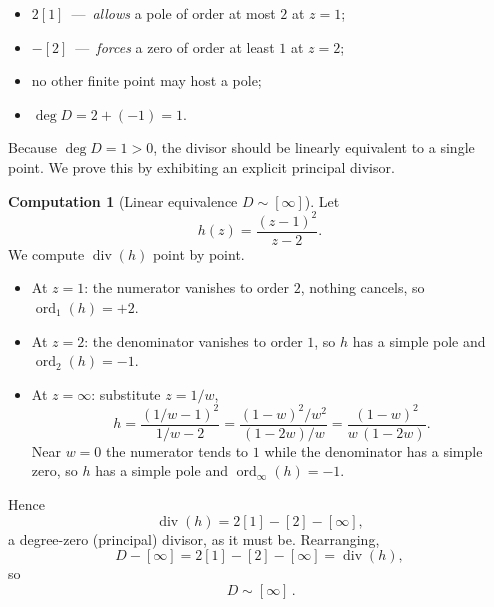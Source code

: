 \documentclass[11pt]{article}
\newcommand{\divisor}{\operatorname{div}}
\newcommand{\ord}{\operatorname{ord}}
\theoremstyle{definition}
\newtheorem{computation}{Computation}
\theoremstyle{plain}
\begin{document}
\begin{itemize}
  \item \(2[1]\) \,---\, \emph{allows} a pole of order at most \(2\) at \(z=1\);
  \item \(-[2]\) \,---\, \emph{forces} a zero of order at least \(1\) at \(z=2\);
  \item no other finite point may host a pole;
  \item \(\deg D = 2+(-1)=1.\)
\end{itemize}

\begin{center}
\end{center}

\noindent
Because \(\deg D=1>0\), the divisor should be linearly equivalent to a single
point. We prove this by exhibiting an explicit principal divisor.

\begin{computation}[{Linear equivalence \(D\sim[\infty]\)}]
Let
\[
  h(z)=\frac{(z-1)^2}{z-2}.
\]
We compute \(\divisor(h)\) point by point.
\begin{itemize}
  \item At \(z=1\): the numerator vanishes to order \(2\), nothing cancels, so
        \(\ord_1(h)=+2\).
  \item At \(z=2\): the denominator vanishes to order \(1\), so \(h\) has a
        simple pole and \(\ord_2(h)=-1\).
  \item At \(z=\infty\): substitute \(z=1/w\),
        \[
          h=\frac{(1/w-1)^2}{1/w-2}
           =\frac{(1-w)^2/w^2}{(1-2w)/w}
           =\frac{(1-w)^2}{w\,(1-2w)} .
        \]
        Near \(w=0\) the numerator tends to \(1\) while the denominator has a
        simple zero, so \(h\) has a simple pole and \(\ord_\infty(h)=-1\).
\end{itemize}
Hence
\[
  \divisor(h)=2[1]-[2]-[\infty],
\]
a degree-zero (principal) divisor, as it must be. Rearranging,
\[
  D-[\infty]=2[1]-[2]-[\infty]=\divisor(h),
\]
so
\[
  \boxed{\,D\sim[\infty]\,}.
\]
\end{computation}
\end{document}
